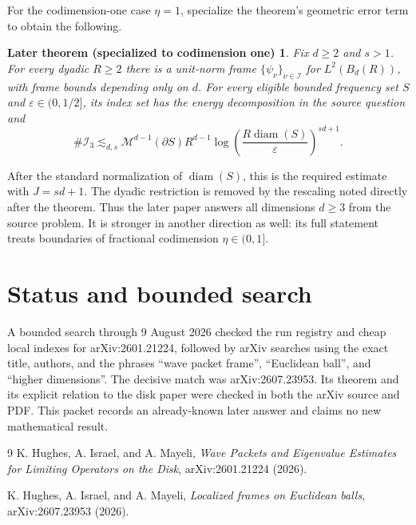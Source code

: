 \documentclass[11pt]{article}
\newtheorem*{answer}{Later theorem (specialized to codimension one)}
\begin{document}
For the codimension-one case $\eta=1$, specialize the theorem's geometric
error term to obtain the following.

\begin{answer}
Fix $d\geq2$ and $s>1$.  For every dyadic $R\geq2$ there is a unit-norm frame
$\{\psi_\nu\}_{\nu\in\mathcal I}$ for $L^2(B_d(R))$, with frame bounds
depending only on $d$.  For every eligible bounded frequency set $S$ and
$\varepsilon\in(0,1/2]$, its index set has the energy decomposition in the
source question and
\[
 \#\mathcal I_3
 \lesssim_{d,s}
 \mathcal M^{d-1}(\partial S)R^{d-1}
 \log\!\left(\frac{R\operatorname{diam}(S)}{\varepsilon}\right)^{sd+1}.
\]
\end{answer}

After the standard normalization of $\operatorname{diam}(S)$, this is the
required estimate with $J=sd+1$.  The dyadic restriction is removed by the
rescaling noted directly after the theorem.  Thus the later paper answers all
dimensions $d\geq3$ from the source problem.  It is stronger in another
direction as well: its full statement treats boundaries of fractional
codimension $\eta\in(0,1]$.

\section{Status and bounded search}

A bounded search through 9 August 2026 checked the run registry and cheap
local indexes for arXiv:2601.21224, followed by arXiv searches using the exact
title, authors, and the phrases ``wave packet frame'', ``Euclidean ball'', and
``higher dimensions''.  The decisive match was arXiv:2607.23953.  Its theorem
and its explicit relation to the disk paper were checked in both the arXiv
source and PDF.  This packet records an already-known later answer and claims
no new mathematical result.

\begin{thebibliography}{9}
K. Hughes, A. Israel, and A. Mayeli,
\emph{Wave Packets and Eigenvalue Estimates for Limiting Operators on the
Disk}, arXiv:2601.21224 (2026).

K. Hughes, A. Israel, and A. Mayeli,
\emph{Localized frames on Euclidean balls}, arXiv:2607.23953 (2026).
\end{thebibliography}
\end{document}
